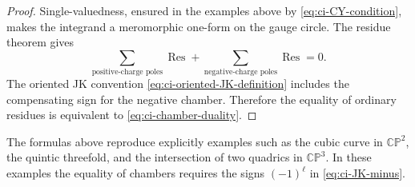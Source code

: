 \documentclass[11pt,a4paper]{article}
\numberwithin{equation}{section}
\theoremstyle{plain}
\theoremstyle{definition}
\theoremstyle{remark}
\begin{document}
\begin{proof}
Single-valuedness, ensured in the examples above by \eqref{eq:ci-CY-condition}, makes the integrand a meromorphic one-form on the gauge circle.  The residue theorem gives
\begin{equation}
\sum_{\text{positive-charge poles}}\operatorname{Res}
+
\sum_{\text{negative-charge poles}}\operatorname{Res}=0.
\end{equation}
The oriented JK convention \eqref{eq:ci-oriented-JK-definition} includes the compensating sign for the negative chamber.  Therefore the equality of ordinary residues is equivalent to \eqref{eq:ci-chamber-duality}.
\end{proof}

The formulas above reproduce explicitly examples such as the cubic curve in \(\mathbb{CP}^2\), the quintic threefold, and the intersection of two quadrics in \(\mathbb{CP}^3\). In these examples the equality of chambers requires the signs \((-1)^\ell\) in \eqref{eq:ci-JK-minus}.
\end{document}
